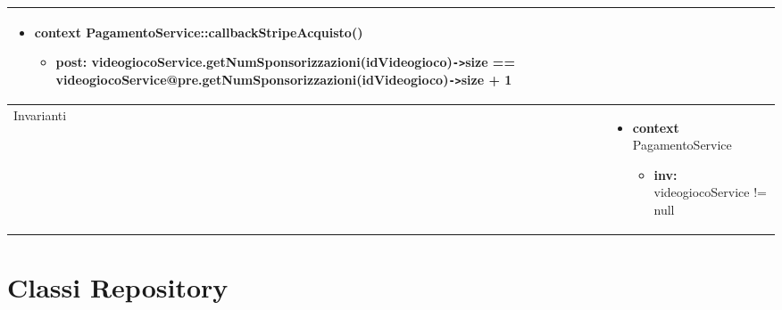 \begin{tabular}{|| l | p{28em} ||}
\begin{itemize}[leftmargin=*]
		\item \textbf{context} PagamentoService::callbackStripeAcquisto()
		\begin{itemize}
			\item[ ] \textbf{post:} videogiocoService.getNumSponsorizzazioni(idVideogioco)\verb|->|size == videogiocoService@pre.getNumSponsorizzazioni(idVideogioco)\verb|->|size + 1
		\end{itemize}
	\end{itemize}\\
	\hline
	Invarianti & \begin{itemize}
		\item \textbf{context} PagamentoService
		\begin{itemize}
			\item[ ] \textbf{inv:} videogiocoService != null
		\end{itemize}
	\end{itemize}\\
	\hline
\end{tabular}


\newpage
\section{Classi Repository}
